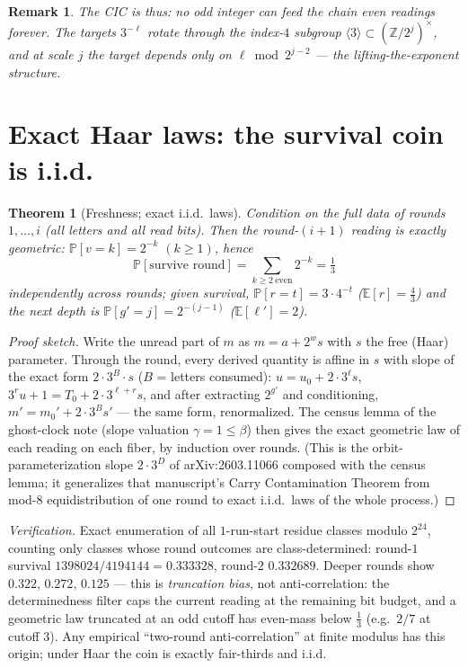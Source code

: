 \documentclass[11pt]{article}
\newtheorem{theorem}{Theorem}
\newtheorem*{remark}{Remark}
\begin{document}
\begin{remark}
The CIC is thus: \emph{no odd integer can feed the chain even
readings forever}. The targets $3^{-\ell}$ rotate through the index-$4$
subgroup $\langle3\rangle\subset(\mathbb Z/2^j)^\times$, and at scale
$j$ the target depends only on $\ell\bmod2^{j-2}$ --- the
lifting-the-exponent structure.
\end{remark}

\section{Exact Haar laws: the survival coin is i.i.d.}

\begin{theorem}[Freshness; exact i.i.d.\ laws]\label{thm:iid}
Condition on the full data of rounds $1,\dots,i$ (all letters and all
read bits). Then the round-$(i{+}1)$ reading is exactly geometric:
$\mathbb P[v=k]=2^{-k}$ $(k\ge1)$, hence
\[
\mathbb P[\text{survive round}]=\sum_{k\ge2\ \mathrm{even}}2^{-k}
=\tfrac13
\]
independently across rounds; given survival,
$\mathbb P[r=t]=3\cdot4^{-t}$ ($\mathbb E[r]=\tfrac43$) and the next
depth is $\mathbb P[g'=j]=2^{-(j-1)}$ ($\mathbb E[\ell']=2$).
\end{theorem}

\begin{proof}[Proof sketch]
Write the unread part of $m$ as $m=a+2^{w}s$ with $s$ the free (Haar)
parameter. Through the round, every derived quantity is affine in $s$
with slope of the exact form $2\cdot3^{B}\cdot s$ ($B$ = letters
consumed): $u=u_0+2\cdot3^{\ell}s$, $3^ru+1=T_0+2\cdot3^{\ell+r}s$,
and after extracting $2^{g'}$ and conditioning, $m'=m_0'+2\cdot3^{B}s'$
--- the same form, renormalized. The census lemma of the ghost-clock
note (slope valuation $\gamma=1\le\beta$) then gives the exact
geometric law of each reading on each fiber, by induction over
rounds. (This is the orbit-parameterization slope $2\cdot3^{D}$ of
arXiv:2603.11066 composed with the census lemma; it generalizes that
manuscript's Carry Contamination Theorem from mod-$8$ equidistribution
of one round to exact i.i.d.\ laws of the whole process.)
\end{proof}

\noindent\emph{Verification.} Exact enumeration of all $1$-run-start
residue classes modulo $2^{24}$, counting only classes whose round
outcomes are class-determined: round-$1$ survival
$1398024/4194144=0.333328$, round-$2$ $0.332689$. Deeper rounds show
$0.322$, $0.272$, $0.125$ --- this is \emph{truncation bias}, not
anti-correlation: the determinedness filter caps the current reading
at the remaining bit budget, and a geometric law truncated at an odd
cutoff has even-mass below $\tfrac13$ (e.g.\ $2/7$ at cutoff $3$). Any
empirical ``two-round anti-correlation'' at finite modulus has this
origin; under Haar the coin is exactly fair-thirds and i.i.d.
\end{document}
